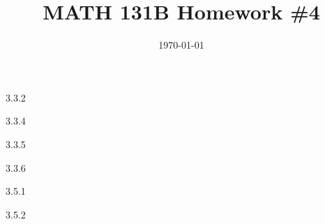 \documentclass{article}
\date{\today}
\title{MATH 131B Homework \#4}
\begin{document}
\maketitle

\begin{prob}
    3.3.2
\end{prob}

\bigskip
\begin{prob}
    3.3.4
\end{prob}

\bigskip
\begin{prob}
    3.3.5
\end{prob}

\bigskip
\begin{prob}
    3.3.6
\end{prob}

\bigskip
\begin{prob}
    3.5.1
\end{prob}

\bigskip
\begin{prob}
    3.5.2
\end{prob}


\end{document}
